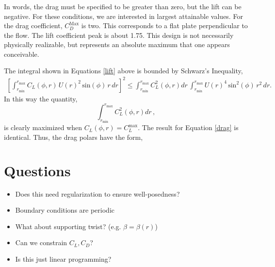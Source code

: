 \documentclass{article}
\begin{document}
In words, the drag must be specified to be greater than zero, but
the lift can be negative. For these conditions, we are interested in
largest attainable values. For the drag coefficient, $C_D^{\text{Max}}$
is two. %
This corresponds to a flat plate perpendicular to the flow.
The lift coefficient peak is about 1.75. This design is not necessarily
physically realizable, but represents an absolute maximum that one
appears conceivable. 

The integral shown in Equations \ref{lift} above is bounded by 
Schwarz's Inequality,  
\begin{align}
  \left[\int_{r_{\text{min}}}^{r_{\text{max}}} C_L(\phi,r)\, U(r)^2
 \,\text{sin}(\phi)\, r\,dr \right]^2 \le 
 \int_{r_{\text{min}}}^{r_{\text{max}}} C_L^2(\phi,r) dr \,
 \int_{r_{\text{min}}}^{r_{\text{max}}} U(r)^4 
 \,\text{sin}^2(\phi)\, r^2\,dr.
\end{align}
In this way the quantity,
\begin{equation}
 \int_{r_{\text{min}}}^{r_{\text{max}}} C_L^2(\phi,r) dr \,, 
\end{equation}
is clearly maximized when $C_L(\phi,r) = C_L^{\text{max}}$. 
The result for Equation \ref{drag} is identical. Thus, the drag polars
have the form, 


\section{Questions}

\begin{itemize}
 \item Does this need regularization to ensure well-posedness?
 \item Boundary conditions are periodic
 \item What about supporting twist? (e.g. $\beta = \beta(r)$)
 \item Can we constrain $C_L, C_D$?
 \item Is this just linear programming?
\end{itemize}
\end{document}
